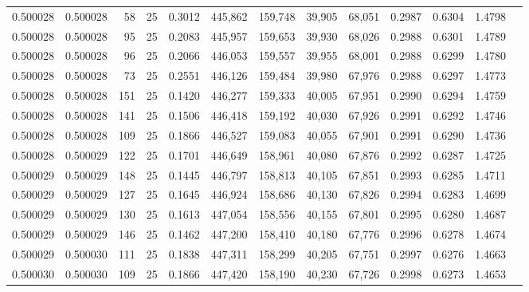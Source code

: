 \begin{tabular}{rrrrrrrrrrrrr}
0.500028 & 0.500028 &    58 &  25 &                                     0.3012 & 445,862 & 159,748 &  39,905 &  68,051 & 0.2987 & 0.6304 & 1.4798 \\
0.500028 & 0.500028 &    95 &  25 &                                     0.2083 & 445,957 & 159,653 &  39,930 &  68,026 & 0.2988 & 0.6301 & 1.4789 \\
0.500028 & 0.500028 &    96 &  25 &                                     0.2066 & 446,053 & 159,557 &  39,955 &  68,001 & 0.2988 & 0.6299 & 1.4780 \\
0.500028 & 0.500028 &    73 &  25 &                                     0.2551 & 446,126 & 159,484 &  39,980 &  67,976 & 0.2988 & 0.6297 & 1.4773 \\
0.500028 & 0.500028 &   151 &  25 &                                     0.1420 & 446,277 & 159,333 &  40,005 &  67,951 & 0.2990 & 0.6294 & 1.4759 \\
0.500028 & 0.500028 &   141 &  25 &                                     0.1506 & 446,418 & 159,192 &  40,030 &  67,926 & 0.2991 & 0.6292 & 1.4746 \\
0.500028 & 0.500028 &   109 &  25 &                                     0.1866 & 446,527 & 159,083 &  40,055 &  67,901 & 0.2991 & 0.6290 & 1.4736 \\
0.500028 & 0.500029 &   122 &  25 &                                     0.1701 & 446,649 & 158,961 &  40,080 &  67,876 & 0.2992 & 0.6287 & 1.4725 \\
0.500029 & 0.500029 &   148 &  25 &                                     0.1445 & 446,797 & 158,813 &  40,105 &  67,851 & 0.2993 & 0.6285 & 1.4711 \\
0.500029 & 0.500029 &   127 &  25 &                                     0.1645 & 446,924 & 158,686 &  40,130 &  67,826 & 0.2994 & 0.6283 & 1.4699 \\
0.500029 & 0.500029 &   130 &  25 &                                     0.1613 & 447,054 & 158,556 &  40,155 &  67,801 & 0.2995 & 0.6280 & 1.4687 \\
0.500029 & 0.500029 &   146 &  25 &                                     0.1462 & 447,200 & 158,410 &  40,180 &  67,776 & 0.2996 & 0.6278 & 1.4674 \\
0.500029 & 0.500030 &   111 &  25 &                                     0.1838 & 447,311 & 158,299 &  40,205 &  67,751 & 0.2997 & 0.6276 & 1.4663 \\
0.500030 & 0.500030 &   109 &  25 &                                     0.1866 & 447,420 & 158,190 &  40,230 &  67,726 & 0.2998 & 0.6273 & 1.4653 \\

\end{tabular}
